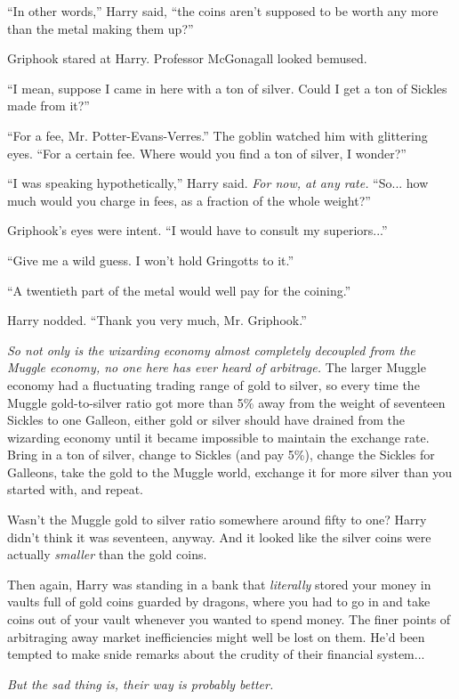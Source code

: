 ``In other words,'' Harry said, ``the coins aren't supposed to be worth any more than the metal making them up?''

Griphook stared at Harry. Professor McGonagall looked bemused.

``I mean, suppose I came in here with a ton of silver. Could I get a ton of Sickles made from it?''

``For a fee, Mr. Potter-Evans-Verres.'' The goblin watched him with glittering eyes. ``For a certain fee. Where would you find a ton of silver, I wonder?''

``I was speaking hypothetically,'' Harry said. \emph{For now, at any rate.} ``So... how much would you charge in fees, as a fraction of the whole weight?''

Griphook's eyes were intent. ``I would have to consult my superiors...''

``Give me a wild guess. I won't hold Gringotts to it.''

``A twentieth part of the metal would well pay for the coining.''

Harry nodded. ``Thank you very much, Mr. Griphook.''

\emph{So not only is the wizarding economy almost completely decoupled from the Muggle economy, no one here has ever heard of arbitrage.} The larger Muggle economy had a fluctuating trading range of gold to silver, so every time the Muggle gold-to-silver ratio got more than 5\% away from the weight of seventeen Sickles to one Galleon, either gold or silver should have drained from the wizarding economy until it became impossible to maintain the exchange rate. Bring in a ton of silver, change to Sickles (and pay 5\%), change the Sickles for Galleons, take the gold to the Muggle world, exchange it for more silver than you started with, and repeat.

Wasn't the Muggle gold to silver ratio somewhere around fifty to one? Harry didn't think it was seventeen, anyway. And it looked like the silver coins were actually \emph{smaller} than the gold coins.

Then again, Harry was standing in a bank that \emph{literally} stored your money in vaults full of gold coins guarded by dragons, where you had to go in and take coins out of your vault whenever you wanted to spend money. The finer points of arbitraging away market inefficiencies might well be lost on them. He'd been tempted to make snide remarks about the crudity of their financial system...

\emph{But the sad thing is, their way is probably better.}

